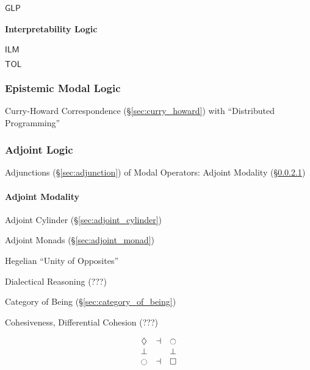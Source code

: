 $\mathsf{GLP}$



\paragraph{Interpretability Logic}\label{sec:interpretability_logic}\hfill

$\mathsf{ILM}$

$\mathsf{TOL}$



\subsubsection{Epistemic Modal Logic}\label{sec:epistemic_logic}

Curry-Howard Correspondence (\S\ref{sec:curry_howard}) with
``Distributed Programming''



\subsubsection{Adjoint Logic}\label{sec:adjoint_logic}

Adjunctions (\S\ref{sec:adjunction}) of Modal Operators: Adjoint
Modality (\S\ref{sec:adjoint_modality})



\paragraph{Adjoint Modality}\label{sec:adjoint_modality}\hfill

Adjoint Cylinder (\S\ref{sec:adjoint_cylinder})

Adjoint Monads (\S\ref{sec:adjoint_monad})

Hegelian ``Unity of Opposites''

Dialectical Reasoning (???) %

Category of Being (\S\ref{sec:category_of_being})

Cohesiveness, Differential Cohesion (???)

\[
  \begin{matrix}
    \lozenge & \dashv & \ocircle \\
    \bot & \empty & \bot \\
    \ocircle & \dashv & \square
  \end{matrix}
\]




